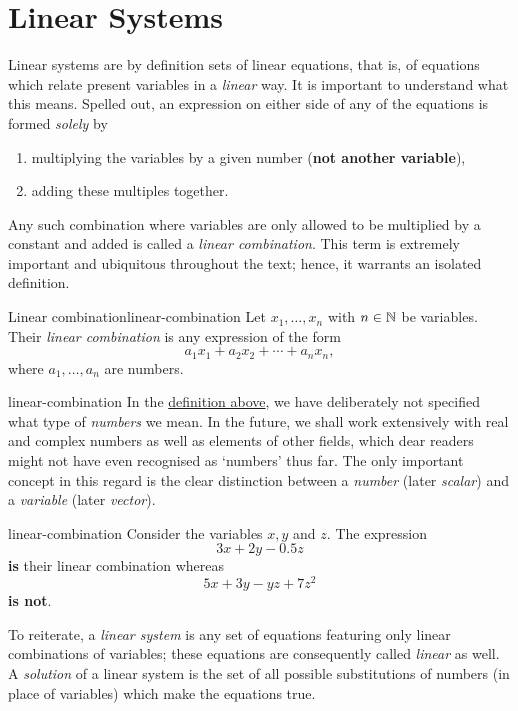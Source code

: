 \chapter{Linear Systems}
\label{chap:linear-systems}

Linear systems are by definition sets of linear equations, that is, of equations
which relate present variables in a \emph{linear} way. It is important to
understand what this means. Spelled out, an expression on either side of any of
the equations is formed \emph{solely} by
\begin{enumerate}
 \item multiplying the variables by a given number (\textbf{not another
  variable}),
 \item adding these multiples together.
\end{enumerate}
Any such combination where variables are only allowed to be multiplied by a
constant and added is called a \emph{linear combination}. This term is extremely
important and ubiquitous throughout the text; hence, it warrants an isolated
definition. 

\begin{definition}{Linear combination}{linear-combination}
 Let $x_1,\ldots,x_n$ with $n \in \mathbb{N}$ be variables. Their \emph{linear
 combination} is any expression of the form
 \[
  a_1x_1 + a_2x_2 + \cdots + a_n x_n,
 \]
 where $a_1,\ldots,a_n$ are numbers.
\end{definition}

\begin{remark}{}{linear-combination}
 In the \hyperref[def:linear-combination]{definition above}, we have
 deliberately not specified what type of \emph{numbers} we mean. In the future,
 we shall work extensively with real and complex numbers as well as elements of
 other fields, which dear readers might not have even recognised as `numbers'
 thus far. The only important concept in this regard is the clear distinction
 between a \emph{number} (later \emph{scalar}) and a \emph{variable} (later
 \emph{vector}).
\end{remark}

\begin{example}{}{linear-combination}
 Consider the variables $x,y$ and $z$. The expression
 \[
  3x + 2y - 0.5z
 \]
 \textbf{is} their linear combination whereas
 \[
  5x + 3y - yz + 7z^2
 \]
 \textbf{is not}.
\end{example}

To reiterate, a \emph{linear system} is any set of equations featuring only
linear combinations of variables; these equations are consequently called
\emph{linear} as well. A \emph{solution} of a linear system is the set of all
possible substitutions of numbers (in place of variables) which make the
equations true.

